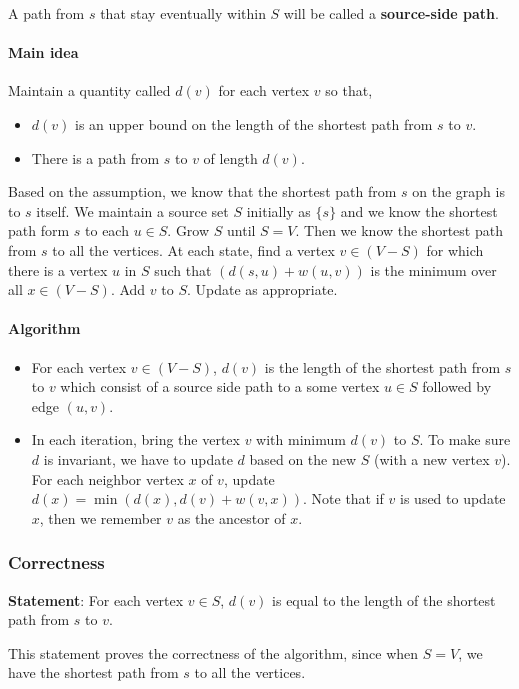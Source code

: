 A path from $s$ that stay eventually within $S$ will be called a \textbf{source-side path}.

\paragraph{Main idea}
Maintain a quantity called $d(v)$ for each vertex $v$ so that,
\begin{itemize}
	\item $d(v)$ is an upper bound on the length of the shortest path from $s$ to $v$.
	\item There is a path from $s$ to $v$ of length $d(v)$.
\end{itemize}

Based on the assumption, we know that the shortest path from $s$ on the graph is to $s$ itself. We maintain a source set $S$ initially as $\{s\}$ and we know the shortest path form $s$ to each $u \in S$. Grow $S$ until $S = V$. Then we know the shortest path from $s$ to all the vertices.
At each state, find a vertex $v \in (V-S)$ for which there is a vertex $u$ in $S$ such that $(d(s, u) + w(u, v))$ is the minimum over all $x \in (V-S)$. Add $v$ to $S$. Update as appropriate.

\paragraph{Algorithm} 
\begin{itemize}
	\item For each vertex $v \in (V-S)$, $d(v)$ is the length of the shortest path from $s$ to $v$ which consist of a source side path to a some vertex $u \in S$ followed by edge $(u,v)$.
	\item In each iteration, bring the vertex $v$ with minimum $d(v)$ to $S$. To make sure $d$ is invariant, we have to update $d$ based on the new $S$ (with a new vertex $v$). For each neighbor vertex $x$ of $v$, update $d(x) = \min(d(x), d(v) + w(v, x))$. Note that if $v$ is used to update $x$, then we remember $v$ as the ancestor of $x$.
\end{itemize}

\subsubsection{Correctness}
\textbf{Statement}: For each vertex $v \in S$, $d(v)$ is equal to the length of the shortest path from $s$ to $v$.

This statement proves the correctness of the algorithm, since when $S = V$, we have the shortest path from $s$ to all the vertices.


